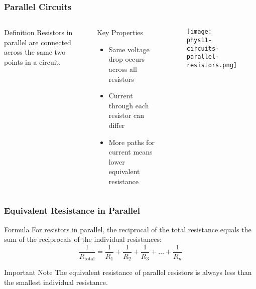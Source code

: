 \documentclass{beamer}
\begin{document}
\begin{frame}
    \frametitle{Parallel Circuits}
    \begin{columns}
        \begin{block}{Definition}
            Resistors in parallel are connected across the same two points in a circuit.
        \end{block}
        
        \begin{block}{Key Properties}
            \begin{itemize}
                \item Same voltage drop occurs across all resistors
                \item Current through each resistor can differ
                \item More paths for current means lower equivalent resistance
            \end{itemize}
        \end{block}
        
        \begin{alertblock}{ }
           \begin{figure}
               \centering
               \texttt{[image: phys11-circuits-parallel-resistors.png]}
           \end{figure}
        \end{alertblock}
    \end{columns}
\end{frame}

\begin{frame}
    \frametitle{Equivalent Resistance in Parallel}
    \begin{block}{Formula}
        For resistors in parallel, the reciprocal of the total resistance equals the sum of the reciprocals of the individual resistances:
        \begin{equation}
            \frac{1}{R_{\text{total}}} = \frac{1}{R_1} + \frac{1}{R_2} + \frac{1}{R_3} + \ldots + \frac{1}{R_n}
        \end{equation}
    \end{block}
    
   
    \begin{block}{Important Note}
        The equivalent resistance of parallel resistors is always less than the smallest individual resistance.
    \end{block}
\end{frame}
\end{document}
